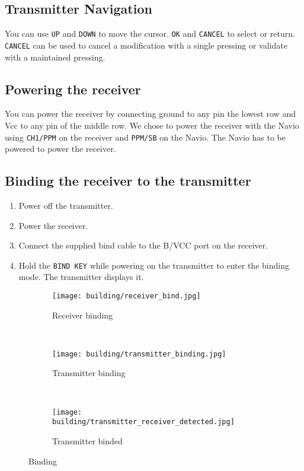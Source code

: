 \subsection{Transmitter Navigation}
You can use \texttt{UP} and \texttt{DOWN} to move the cursor.
\texttt{OK} and \texttt{CANCEL} to select or return.
\texttt{CANCEL} can be used to cancel a modification with a single pressing or validate with a maintained pressing.

\subsection{Powering the receiver}
You can power the receiver by connecting ground to any pin the lowest row and Vcc to any pin of the middle row.
We chose to power the receiver with the Navio using \texttt{CH1/PPM} on the receiver and \texttt{PPM/SB} on the Navio. The Navio has to be powered to power the receiver.

\subsection{Binding the receiver to the transmitter}
\begin{enumerate}
    \item Power off the transmitter.
    \item Power the receiver.
    \item Connect the supplied bind cable to the B/VCC port on the receiver.
    \item Hold the \texttt{BIND KEY} while powering on the transmitter to enter the binding mode. The transmitter displays it.
\end{enumerate}

\begin{figure}[!ht]
    \centering
    \begin{subfigure}[b]{0.3\textwidth}
        \texttt{[image: building/receiver\_bind.jpg]}
        \caption{Receiver binding}
        \label{fig:receiver_bind}
    \end{subfigure}
    ~
    \begin{subfigure}[b]{0.3\textwidth}
        \texttt{[image: building/transmitter\_binding.jpg]}
        \caption{Transmitter binding}
        \label{fig:transmitter_binding}
    \end{subfigure}
    ~
    \begin{subfigure}[b]{0.3\textwidth}
        \texttt{[image: building/transmitter\_receiver\_detected.jpg]}
        \caption{Transmitter binded}
        \label{fig:transmitter_receiver_detected}
    \end{subfigure}
    \caption{Binding}\label{fig:binding}
\end{figure}

